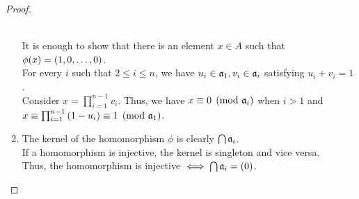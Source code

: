 \begin{proof}
\begin{enumerate}
		\brak{\Longleftarrow} \\
		It is enough to show that there is an element
		\( x \in A \) such that \( \phi(x) = \left( 1, 0, \ldots, 0 \right) \). \\
		For every \( i \) such that \( 2 \leq i \leq n \),
		we have \( u_i \in \mathfrak{a}_1, v_i \in \mathfrak{a}_i \) satisfying
		\( u_i + v_i = 1 \). \\
		Consider \( x = \prod_{i=1}^{n-1} v_i \).
		Thus, we have \( x \equiv 0 \pmod{\mathfrak{a}_i} \) when \( i > 1 \) and \\
		\( x \equiv \prod_{i=1}^{n-1} \left( 1-u_i \right) \equiv 1 \pmod{\mathfrak{a}_1} \).

		\item
		The kernel of the homomorphism \( \phi \) is clearly
		\( \bigcap \mathfrak{a}_i \). \\
		If a homomorphism is injective, the kernel is singleton and
		vice versa. \\
		Thus, the homomorphism is injective
		\( \iff \bigcap \mathfrak{a}_i = \left( 0 \right) \).
	\end{enumerate}
\end{proof}

